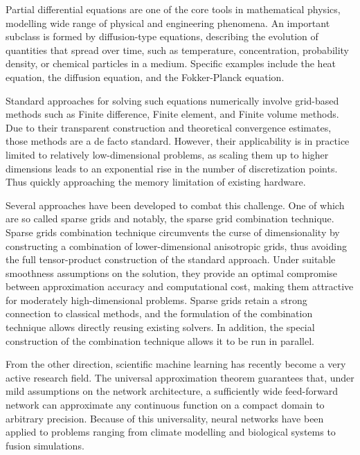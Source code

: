 Partial differential equations are one of the core tools in mathematical physics,
modelling wide range of physical and engineering phenomena.
An important subclass is formed by diffusion-type equations, describing the evolution of quantities
that spread over time, such as temperature, concentration,
probability density, or chemical particles in a medium.
Specific examples include the heat equation, the diffusion equation, and the Fokker-Planck equation.

Standard approaches for solving such equations numerically
involve grid-based methods such as Finite difference,
Finite element, and Finite volume methods.
Due to their transparent construction
and theoretical convergence estimates,
those methods are a de facto standard.
However, their applicability is in practice limited to relatively
low-dimensional problems,
as scaling them up to higher dimensions 
leads to an exponential rise
in the number of discretization points.
Thus quickly approaching the memory limitation of existing hardware.

Several approaches have been developed to combat this challenge.
One of which are so called sparse grids and notably,
the sparse grid combination technique.\cite{smolyak,combitech}
Sparse grids combination technique circumvents the curse of dimensionality
by constructing a combination of lower-dimensional anisotropic grids,
thus avoiding the full tensor-product construction of the standard approach.\cite{sg_123}
Under suitable smoothness assumptions on the solution, they provide
an optimal compromise between approximation accuracy and computational cost,
making them attractive for moderately high-dimensional problems.
Sparse grids retain a strong connection to classical methods,
and the formulation of the combination technique
allows directly reusing existing solvers.
In addition, the special construction of the combination technique
allows it to be run in parallel.

From the other direction, scientific machine learning has recently
become a very active research field.
The universal approximation theorem \cite{uni_approx} guarantees that,
under mild assumptions on the network architecture,
a sufficiently wide feed-forward network can
approximate any continuous function on a compact domain to arbitrary precision.
Because of this universality, neural networks
have been applied to problems ranging from climate modelling and biological systems to fusion simulations.
\cite{hal_hands_on_pinns}

